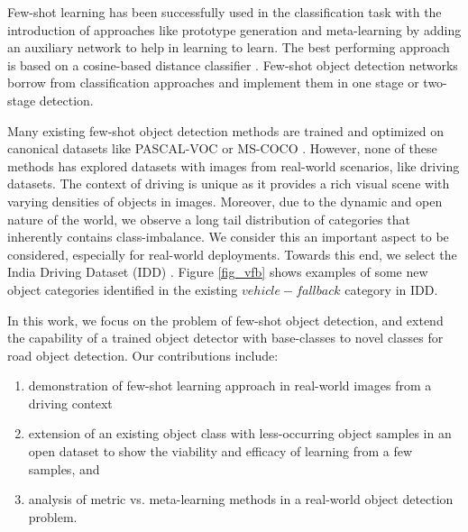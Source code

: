 \documentclass[letterpaper]{article} %
\begin{document}
Few-shot learning has been successfully used in the classification task \cite{matching-net,protonet,maml} with the introduction of approaches like prototype generation and meta-learning by adding an auxiliary network to help in learning to learn.  The best performing approach is based on a cosine-based distance classifier \cite{matching-net}. Few-shot object detection networks borrow from classification approaches and implement them in one stage \cite{reweight} or two-stage \cite{metarcnn,addfeat,fsdet} detection.

Many existing few-shot object detection methods are trained and optimized on canonical datasets like PASCAL-VOC \cite{voc} or MS-COCO \cite{coco}. However, none of these methods has explored datasets with  images from real-world scenarios, like driving datasets. The context of driving is unique as it provides a rich visual scene with varying densities of objects in images. Moreover, due to the dynamic and open nature of the world, we observe a long tail distribution of categories that inherently contains class-imbalance. We consider this an important aspect to be considered, especially for real-world deployments. Towards this end, we select the India Driving Dataset (IDD) \cite{idd}. Figure \ref{fig_vfb} shows examples of some new object categories identified in the existing $vehicle-fallback$ category in IDD.

In this work, we focus on the problem of few-shot object detection, and extend the capability of a trained object detector with base-classes to novel classes for road object detection. Our contributions include:
\begin{enumerate}
    \item demonstration of few-shot learning approach in real-world images from a driving context
    \item extension of an existing object class with less-occurring object samples in an open dataset to  show the viability and efficacy of learning from a few samples, and
    \item analysis of metric vs. meta-learning methods in a real-world object detection problem.
\end{enumerate}
\end{document}
